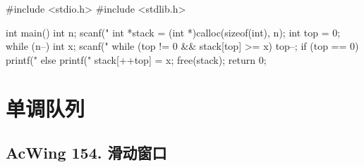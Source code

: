 \begin{mycpptwocol}[单调栈]
    #include <stdio.h>
    #include <stdlib.h>

    int main()
        {
        int n;
        scanf("%
        int *stack = (int *)calloc(sizeof(int), n);
        int top = 0;
        while (n--) {
            int x;
            scanf("%
            while (top != 0 && stack[top] >= x) {
                top--;
            }
            if (top == 0) {
                printf("%
            } else {
                printf("%
            }
            stack[++top] = x;
        }
        free(stack);
        return 0;
    }
\end{mycpptwocol}


\section{单调队列}

\subsection{AcWing 154. 滑动窗口}

